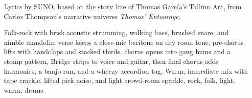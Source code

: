 
\begin{notes}
Lyrics by SUNO, based on the story line of Thomas García's Tallinn Arc, from Carlos Thompson's narrative universe \emph{Thomas’ Entourage}.
\end{notes}
\begin{style}
Folk-rock with brisk acoustic strumming, walking bass, brushed snare, and nimble mandolin; verse keeps a close-mic baritone on dry room tone, pre-chorus lifts with handclaps and stacked thirds, chorus opens into gang hums and a stomp pattern, Bridge strips to voice and guitar, then final chorus adds harmonies, a banjo run, and a wheezy accordion tag, Warm, immediate mix with tape crackle, lifted pick noise, and light crowd-room sparkle, rock, folk, light, warm, drama
\end{style}
